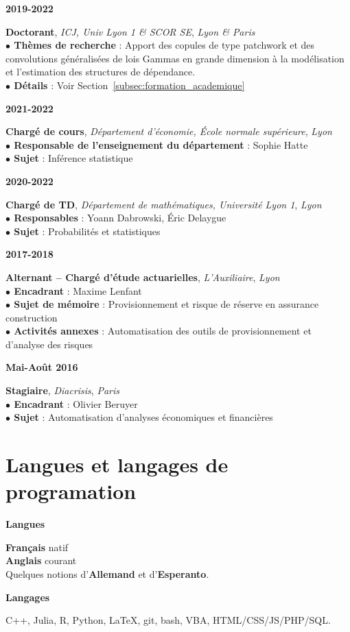\documentclass[a4paper,11pt]{article} %
\newcommand{\tabcv}[2]{
\begin{minipage}[t]{0.12\linewidth}
\textbf{\footnotesize #1}
\end{minipage}\hfill
\begin{minipage}[t]{0.85\linewidth}
#2
\end{minipage}
\vspace{1em}
}
\begin{document}
\begin{flushleft}
\tabcv{2019-2022}{
\textbf{Doctorant}, \textit{ICJ, Univ Lyon 1 \& SCOR SE}, \textit{Lyon \& Paris}\\[0.5em]
{\footnotesize
\textbf{$\bullet$ Thèmes de recherche} : Apport des copules de type patchwork et des convolutions généralisées de lois Gammas en grande dimension à la modélisation et l'estimation des structures de dépendance. \\
\textbf{$\bullet$ Détails} : Voir Section~\ref{subsec:formation_academique}\\
}
}

\tabcv{2021-2022}{
\textbf{Chargé de cours}, \textit{Département d'économie, École normale supérieure}, \textit{Lyon}\\[0.5em]
{\footnotesize
\textbf{$\bullet$ Responsable de l'enseignement du département} : Sophie Hatte\\
\textbf{$\bullet$ Sujet} : Inférence statistique\\
}
}

\tabcv{2020-2022}{
\textbf{Chargé de TD}, \textit{Département de mathématiques, Université Lyon 1}, \textit{Lyon}\\[0.5em]
{\footnotesize
\textbf{$\bullet$ Responsables} : Yoann Dabrowski, Éric Delaygue\\
\textbf{$\bullet$ Sujet} : Probabilités et statistiques\\
}
}

\tabcv{2017-2018}{
\textbf{Alternant -- Chargé d'étude actuarielles}, \textit{L'Auxiliaire}, \textit{Lyon}\\[0.5em]
{\footnotesize
\textbf{$\bullet$ Encadrant} : Maxime Lenfant\\
\textbf{$\bullet$ Sujet de mémoire} : Provisionnement et risque de réserve en assurance construction\\
\textbf{$\bullet$ Activités annexes} : Automatisation des outils de provisionnement et d'analyse des risques\\
}
}


\tabcv{Mai-Août 2016}{
\textbf{Stagiaire}, \textit{Diacrisis}, \textit{Paris}\\[0.5em]
{\footnotesize
\textbf{$\bullet$ Encadrant} : Olivier Beruyer\\
\textbf{$\bullet$ Sujet} : Automatisation d'analyses économiques et financières\\
}
}

\end{flushleft}


\section{Langues et langages de programation}
\tabcv{Langues}{
\textbf{Français} natif\\ 
\textbf{Anglais} courant\\ 
Quelques notions d'\textbf{Allemand} et d'\textbf{Esperanto}.\\
}
\tabcv{Langages}{
C++, Julia, R, Python, \LaTeX, git, bash, VBA, HTML/CSS/JS/PHP/SQL.\\
}
\end{document}
